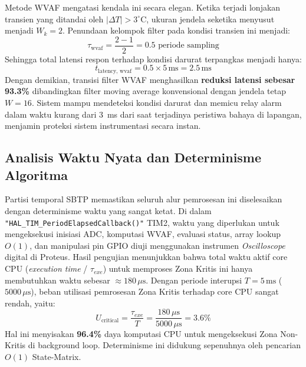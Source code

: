 \documentclass[11pt,a4paper]{article}
\begin{document}
\begin{longtable}
Metode WVAF mengatasi kendala ini secara elegan. Ketika terjadi lonjakan transien yang ditandai oleh $|\Delta T| > 3^\circ\text{C}$, ukuran jendela seketika menyusut menjadi $W_k = 2$. Penundaan kelompok filter pada kondisi transien ini menjadi:
\begin{equation}
\tau_{\text{wvaf}} = \frac{2 - 1}{2} = 0.5 \text{ periode sampling}
\end{equation}
Sehingga total latensi respon terhadap kondisi darurat terpangkas menjadi hanya:
\begin{equation}
t_{\text{latency, wvaf}} = 0.5 \times 5\,\text{ms} = 2.5\,\text{ms}
\end{equation}
\hspace{1.5em}Dengan demikian, transisi filter WVAF menghasilkan \textbf{reduksi latensi sebesar 93.3\%} dibandingkan filter moving average konvensional dengan jendela tetap $W=16$. Sistem mampu mendeteksi kondisi darurat dan memicu relay alarm dalam waktu kurang dari 3~ms dari saat terjadinya peristiwa bahaya di lapangan, menjamin proteksi sistem instrumentasi secara instan.

\subsection{Analisis Waktu Nyata dan Determinisme Algoritma}
\hspace{1.5em}Partisi temporal SBTP memastikan seluruh alur pemrosesan ini diselesaikan dengan determinisme waktu yang sangat ketat. Di dalam \texttt{"HAL\_TIM\_PeriodElapsedCallback()"} TIM2, waktu yang diperlukan untuk mengeksekusi inisiasi ADC, komputasi WVAF, evaluasi status, array lookup $O(1)$, dan manipulasi pin GPIO diuji menggunakan instrumen \textit{Oscilloscope} digital di Proteus. Hasil pengujian menunjukkan bahwa total waktu aktif core CPU (\textit{execution time} / $\tau_{exe}$) untuk memproses Zona Kritis ini hanya membutuhkan waktu sebesar $\approx 180\,\mu\text{s}$. Dengan periode interupsi $T = 5\,\text{ms}$ ($5000\,\mu\text{s}$), beban utilisasi pemrosesan Zona Kritis terhadap core CPU sangat rendah, yaitu:
\begin{equation}
U_{\text{critical}} = \frac{\tau_{exe}}{T} = \frac{180\,\mu\text{s}}{5000\,\mu\text{s}} = 3.6\%
\end{equation}
\hspace{1.5em}Hal ini menyisakan \textbf{96.4\%} daya komputasi CPU untuk mengeksekusi Zona Non-Kritis di background loop. Determinisme ini didukung sepenuhnya oleh pencarian $O(1)$ State-Matrix. 


\end{longtable}
\end{document}

